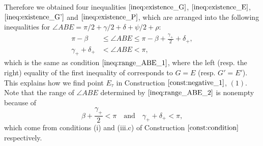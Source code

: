 \documentclass[11pt]{amsart}
\numberwithin{equation}{section}
\numberwithin{theorem}{section}
\begin{document}
Therefore we obtained four inequalities $\eqref{ineq:existence_G}$, $\eqref{ineq:existence_E}$, $\eqref{ineq:existence_G'}$ and $\eqref{ineq:existence_P}$,
which are arranged into the following inequalities for $\angle ABE =\pi /2+\gamma /2+\delta +\psi /2+\rho$:
\begin{equation}\label{ineq:range_ABE_2}
\begin{aligned}
\pi -\beta&\leqslant\angle ABE\leqslant\pi -\beta +\frac{\gamma_+}{2}+\delta_+,\\
\gamma_++\delta_+&<\angle ABE<\pi ,
\end{aligned}
\end{equation}
which is the same as condition $\eqref{ineq:range_ABE_1}$,
where the left (resp. the right) equality of the first inequality of corresponds to $G =E$ (resp. $G'=E'$).
This explains how we find point $E_\tau$ in Construction $\ref{const:negative_1}$, $(1)$.
Note that the range of $\angle ABE$ determined by $\eqref{ineq:range_ABE_2}$ is nonempty because of
\begin{equation}\label{ineq:nonempty}
\beta +\frac{\gamma_+}{2}<\pi\quad\text{and}\quad\gamma_++\delta_+<\pi ,
\end{equation}
which come from conditions (i) and (iii.c) of Construction $\ref{const:condition}$ respectively.
\end{document}
